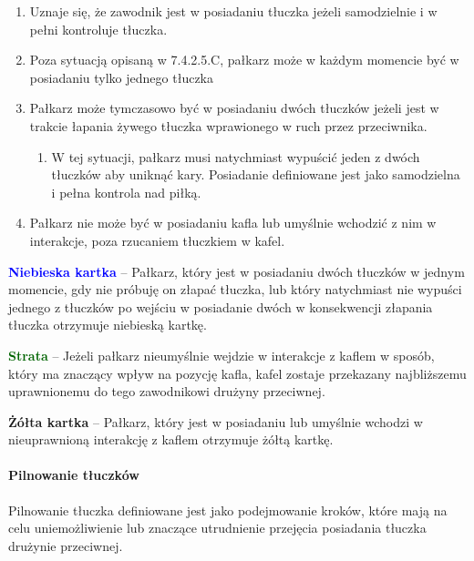 \documentclass[12pt]{article}
\newcommand\yellowcard[1]{\bgroup\textcolor{darkyellow}{\textbf{#1}}}
\newcommand\bluecard[1]{\bgroup\textcolor{blue}{\textbf{#1}}}
\newcommand\other[1]{\bgroup\textcolor{darkgreen}{\textbf{#1}}}
\begin{document}
\begin{enumerate}
	\item
	      Uznaje się, że zawodnik jest w posiadaniu tłuczka jeżeli samodzielnie
	      i w pełni kontroluje tłuczka.
	\item
	      Poza sytuacją opisaną w 7.4.2.5.C, pałkarz może w każdym momencie być
	      w posiadaniu tylko jednego tłuczka
	\item
	      Pałkarz może tymczasowo być w posiadaniu dwóch tłuczków jeżeli jest w
	      trakcie łapania żywego tłuczka wprawionego w ruch przez przeciwnika.

	      \begin{enumerate}
		      \item
		            W tej sytuacji, pałkarz musi natychmiast wypuścić jeden z dwóch
		            tłuczków aby uniknąć kary. Posiadanie definiowane jest jako
		            samodzielna i pełna kontrola nad piłką.
	      \end{enumerate}
	\item
	      Pałkarz nie może być w posiadaniu kafla lub umyślnie wchodzić z nim w
	      interakcje, poza rzucaniem tłuczkiem w kafel.
\end{enumerate}

\bluecard{Niebieska kartka} -- Pałkarz, który jest w posiadaniu dwóch
tłuczków w jednym momencie, gdy nie próbuję on złapać tłuczka, lub który
natychmiast nie wypuści jednego z tłuczków po wejściu w posiadanie dwóch
w konsekwencji złapania tłuczka otrzymuje niebieską kartkę.

\other{Strata} -- Jeżeli pałkarz nieumyślnie wejdzie w interakcje z kaflem
w sposób, który ma znaczący wpływ na pozycję kafla, kafel zostaje
przekazany najbliższemu uprawnionemu do tego zawodnikowi drużyny
przeciwnej.

\yellowcard{Żółta kartka} -- Pałkarz, który jest w posiadaniu lub umyślnie
wchodzi w nieuprawnioną interakcję z kaflem otrzymuje żółtą kartkę.

\paragraph{Pilnowanie tłuczków}
Pilnowanie tłuczka definiowane
jest jako podejmowanie kroków, które mają na celu uniemożliwienie lub
znaczące utrudnienie przejęcia posiadania tłuczka drużynie przeciwnej.
\end{document}
